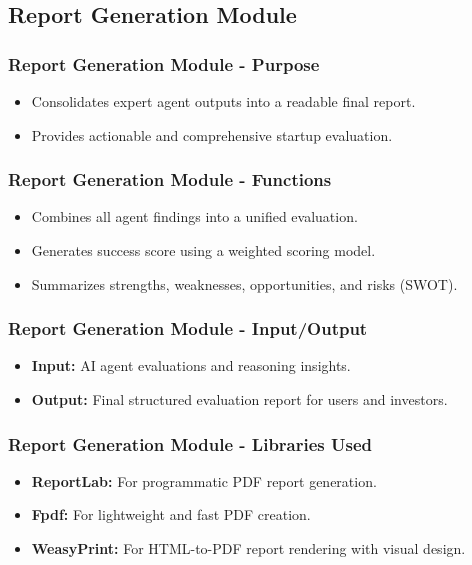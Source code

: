 \documentclass{beamer}
\begin{document}
\subsection{Report Generation Module}

\begin{frame}
\frametitle{Report Generation Module - Purpose}
\begin{itemize}
    \item Consolidates expert agent outputs into a readable final report.
    \item Provides actionable and comprehensive startup evaluation.
\end{itemize}
\end{frame}

\begin{frame}
\frametitle{Report Generation Module - Functions}
\begin{itemize}
    \item Combines all agent findings into a unified evaluation.
    \item Generates success score using a weighted scoring model.
    \item Summarizes strengths, weaknesses, opportunities, and risks (SWOT).
\end{itemize}
\end{frame}

\begin{frame}
\frametitle{Report Generation Module - Input/Output}
\begin{itemize}
    \item \textbf{Input:} AI agent evaluations and reasoning insights.
    \item \textbf{Output:} Final structured evaluation report for users and investors.
\end{itemize}
\end{frame}

\begin{frame}
\frametitle{Report Generation Module - Libraries Used}
\begin{itemize}
    \item \textbf{ReportLab:} For programmatic PDF report generation.
    \item \textbf{Fpdf:} For lightweight and fast PDF creation.
    \item \textbf{WeasyPrint:} For HTML-to-PDF report rendering with visual design.
\end{itemize}
\end{frame}
\end{document}
